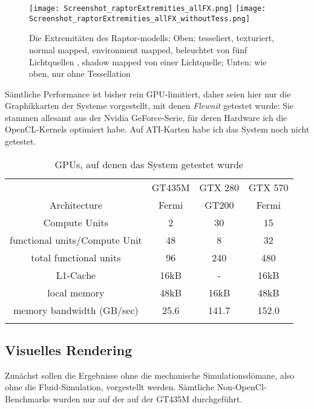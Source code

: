 
\label{sec:ergebnisse}

\begin{figure}[!h]

	\texttt{[image: Screenshot\_raptorExtremities\_allFX.png]} 
	\texttt{[image: Screenshot\_raptorExtremities\_allFX\_withoutTess.png]}

	\caption{Die Extremitäten des Raptor-modells; Oben: tesseliert, texturiert, normal mapped, environment mapped, 
	beleuchtet von fünf Lichtquellen , shadow mapped von einer Lichtquelle; Unten: wie oben, nur ohne Tessellation
	}
	\label{fig:raptorExtremitiesTessVSNonTess}
\end{figure}

Sämtliche Performance ist bisher rein GPU-limitiert, daher seien hier nur die
Graphikkarten der Systeme vorgestellt, mit denen \emph{Flewnit} getestet wurde: Sie stammen allesamt aus der 
Nvidia GeForce-Serie, für deren Hardware ich die OpenCL-Kernels optimiert habe. Auf ATI-Karten habe ich das
System noch nicht getestet.

\begin{table}[ht]
\begin{tabular}{|c|c|c|c|}
	\noalign{\hrule}
	& GT435M  & GTX 280 & GTX 570 \\
	\noalign{\hrule}
	Architecture &	Fermi & GT200 & Fermi \\
	\noalign{\hrule}
	Compute Units & 2 & 30 & 15 \\
	\noalign{\hrule}
	functional units/Compute Unit & 48 & 8 & 32 \\
	\noalign{\hrule}
	total functional units & 96 & 240 & 480 \\
	\noalign{\hrule}
	L1-Cache & 16kB & -	& 16kB	\\
	\noalign{\hrule}
	local memory & 48kB & 16kB & 48kB \\
	\noalign{\hrule}
	memory bandwidth (GB/sec) & 25.6 &  141.7 & 152.0 \\
	\noalign{\hrule}
\end{tabular}
\caption{GPUs, auf denen das System getestet wurde}
\label{tab:GPUs}
\end{table}



\subsection{Visuelles Rendering}


	Zunächst sollen die Ergebnisse ohne die mechanische Simulationsdömane, also ohne die Fluid-Simulation,
	vorgestellt werden.
	Sämtliche Non-OpenCl- Benchmarks wurden nur auf der auf der GT435M durchgeführt.
	
